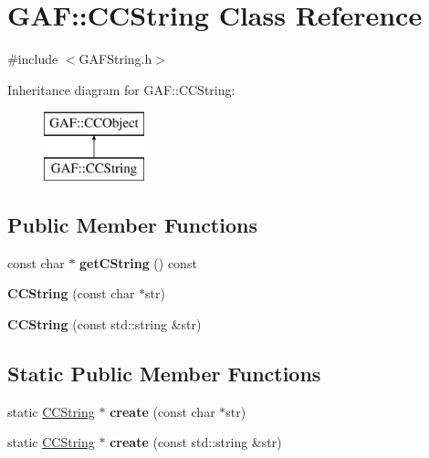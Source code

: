 \hypertarget{class_g_a_f_1_1_c_c_string}{\section{G\-A\-F\-:\-:C\-C\-String Class Reference}
\label{class_g_a_f_1_1_c_c_string}
}


{\ttfamily \#include $<$G\-A\-F\-String.\-h$>$}

Inheritance diagram for G\-A\-F\-:\-:C\-C\-String\-:\begin{figure}[H]
\begin{center}
\leavevmode
\includegraphics[height=2.000000cm]{class_g_a_f_1_1_c_c_string}
\end{center}
\end{figure}
\subsection*{Public Member Functions}
\begin{DoxyCompactItemize}
\item 
\hypertarget{class_g_a_f_1_1_c_c_string_acb10c8d19397ba78338e04c86928af74}{const char $\ast$ {\bfseries get\-C\-String} () const }\label{class_g_a_f_1_1_c_c_string_acb10c8d19397ba78338e04c86928af74}

\item 
\hypertarget{class_g_a_f_1_1_c_c_string_a3a69d5ee2fdd5230bf80cd52269c49ea}{{\bfseries C\-C\-String} (const char $\ast$str)}\label{class_g_a_f_1_1_c_c_string_a3a69d5ee2fdd5230bf80cd52269c49ea}

\item 
\hypertarget{class_g_a_f_1_1_c_c_string_a77a770c1de66847d3706433a5a331ea6}{{\bfseries C\-C\-String} (const std\-::string \&str)}\label{class_g_a_f_1_1_c_c_string_a77a770c1de66847d3706433a5a331ea6}

\end{DoxyCompactItemize}
\subsection*{Static Public Member Functions}
\begin{DoxyCompactItemize}
\item 
\hypertarget{class_g_a_f_1_1_c_c_string_a7bdc8ceafa9da8f5f5f11c57c582ddbb}{static \hyperlink{class_g_a_f_1_1_c_c_string}{C\-C\-String} $\ast$ {\bfseries create} (const char $\ast$str)}\label{class_g_a_f_1_1_c_c_string_a7bdc8ceafa9da8f5f5f11c57c582ddbb}

\item 
\hypertarget{class_g_a_f_1_1_c_c_string_a36edb4b0a30039f240f7057ff8d1448a}{static \hyperlink{class_g_a_f_1_1_c_c_string}{C\-C\-String} $\ast$ {\bfseries create} (const std\-::string \&str)}\label{class_g_a_f_1_1_c_c_string_a36edb4b0a30039f240f7057ff8d1448a}

\end{DoxyCompactItemize}


